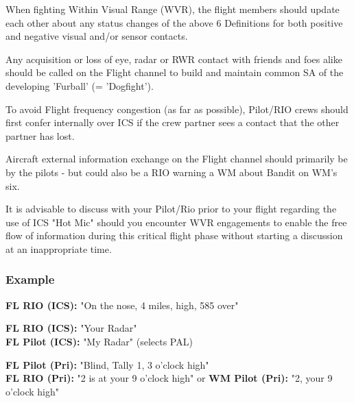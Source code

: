 When fighting Within Visual Range (WVR), the flight members should update each
other about any status changes of the above 6 Definitions for both positive and
negative visual and/or sensor contacts.

Any acquisition or loss of eye, radar or RWR contact with friends and foes
alike should be called on the Flight channel to build and maintain common SA of
the developing 'Furball' (= 'Dogfight').

To avoid Flight frequency congestion (as far as possible), Pilot/RIO crews
should first confer internally over ICS if the crew partner sees a contact that
the other partner has lost.

Aircraft external information exchange on the Flight channel should primarily
be by the pilots - but could also be a RIO warning a WM about Bandit on WM's
six.

It is advisable to discuss with your Pilot/Rio prior to your flight regarding
the use of ICS "Hot Mic" should you encounter WVR engagements to enable the
free flow of information during this critical flight phase without starting a
discussion at an inappropriate time.

\subsubsection*{Example}


\textbf{FL RIO (ICS):} "On the nose, 4 miles, high, 585 over"

\textbf{FL RIO (ICS):} "Your Radar"\\
\textbf{FL Pilot (ICS):} "My Radar" (selects PAL)

\textbf{FL Pilot (Pri):} "Blind, Tally 1, 3 o'clock high"\\
\textbf{FL RIO (Pri):} "2 is at your 9 o'clock high" or
\textbf{WM Pilot (Pri):} "2, your 9 o'clock high"
